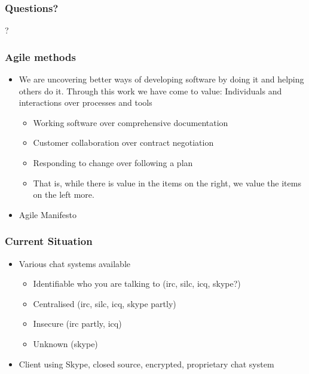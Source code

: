 \documentclass{beamer}
\begin{document}
\frame
{
  \frametitle{Questions?}
  \begin{center}
  ?
  \end{center}
}


\frame
{
  \frametitle{Agile methods}
  \begin{itemize}
    \item 
      We are uncovering better ways of developing software by doing it and helping others do it. Through this work we have come to value:
      Individuals and interactions over processes and tools
      \begin{itemize}
      \item Working software over comprehensive documentation
      \item Customer collaboration over contract negotiation
      \item Responding to change over following a plan
      \item That is, while there is value in the items on the right, we value the items on the left more.
      \end{itemize}
    \item Agile Manifesto
  \end{itemize}
}


\frame
{
  \frametitle{Current Situation}
  \begin{itemize}
      \item Various chat systems available
      \begin{itemize}
          \item Identifiable who you are talking to (irc, silc, icq, skype?)
          \item Centralised (irc, silc, icq, skype partly)
          \item Insecure (irc partly, icq)
          \item Unknown (skype)
      \end{itemize}
      \item Client using Skype, closed source, encrypted, proprietary chat system
  \end{itemize}
}
\end{document}
